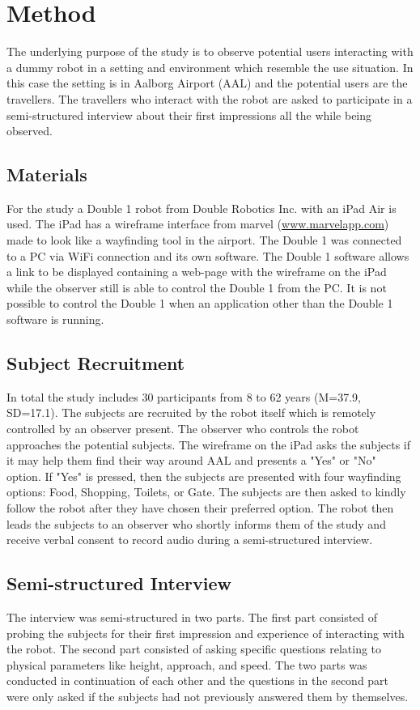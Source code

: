 \section{Method}
\label{Method}
The underlying purpose of the study is to observe potential users interacting with a dummy robot in a setting and environment which resemble the use situation. In this case the setting is in Aalborg Airport (AAL) and the potential users are the travellers. The travellers who interact with the robot are asked to participate in a semi-structured interview about their first impressions all the while being observed. 

\subsection{Materials}
For the study a Double 1 robot from Double Robotics Inc. with an iPad Air is used. The iPad has a wireframe interface from marvel (\url{www.marvelapp.com}) made to look like a wayfinding tool in the airport. The Double 1 was connected to a PC via WiFi connection and its own software. The Double 1 software allows a link to be displayed containing a web-page with the wireframe on the iPad while the observer still is able to control the Double 1 from the PC. It is not possible to control the Double 1 when an application other than the Double 1 software is running.

\subsection{Subject Recruitment}
In total the study includes 30 participants from 8 to 62 years (M=37.9, SD=17.1). The subjects are recruited by the robot itself which is remotely controlled by an observer present. The observer who controls the robot approaches the potential subjects. The wireframe on the iPad asks the subjects if it may help them find their way around AAL and presents a "Yes" or "No" option. If "Yes" is pressed, then the subjects are presented with four wayfinding options: Food, Shopping, Toilets, or Gate. The subjects are then asked to kindly follow the robot after they have chosen their preferred option. The robot then leads the subjects to an observer who shortly informs them of the study and receive verbal consent to record audio during a semi-structured interview.
 
 \subsection{Semi-structured Interview}
 The interview was semi-structured in two parts. The first part consisted of probing the subjects for their first impression and experience of interacting with the robot. The second part consisted of asking specific questions relating to physical parameters like height, approach, and speed. The two parts was conducted in continuation of each other and the questions in the second part were only asked if the subjects had not previously answered them by themselves.
 
